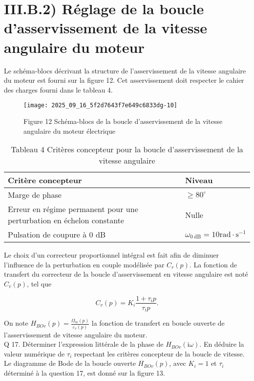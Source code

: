 \section{III.B.2) Réglage de la boucle d'asservissement de la vitesse angulaire du moteur}
Le schéma-blocs décrivant la structure de l'asservissement de la vitesse angulaire du moteur est fourni sur la figure 12. Cet asservissement doit respecter le cahier des charges fourni dans le tableau 4.

\begin{figure}[h]
\begin{center}
  \texttt{[image: 2025\_09\_16\_5f2d7643f7e649c6833dg-10]}
\captionsetup{labelformat=empty}
\caption{Figure 12 Schéma-blocs de la boucle d'asservissement de la vitesse angulaire du moteur électrique}
\end{center}
\end{figure}

\begin{table}[h]
\begin{center}
\begin{tabular}{|l|l|}
\hline
Critère concepteur & Niveau \\
\hline
Marge de phase & $\geqslant 80^{\circ}$ \\
\hline
Erreur en régime permanent pour une perturbation en échelon constante & Nulle \\
\hline
Pulsation de coupure à 0 dB & $\omega_{0 \mathrm{~dB}}=10 \mathrm{rad} \cdot \mathrm{s}^{-1}$ \\
\hline
\end{tabular}
\captionsetup{labelformat=empty}
\caption{Tableau 4 Critères concepteur pour la boucle d'asservissement de la vitesse angulaire}
\end{center}
\end{table}

Le choix d'un correcteur proportionnel intégral est fait afin de diminuer l'influence de la perturbation en couple modélisée par $C_{r}(p)$. La fonction de transfert du correcteur de la boucle d'asservissement en vitesse angulaire est noté $C_{v}(p)$, tel que

$$
C_{v}(p)=K_{i} \frac{1+\tau_{i} p}{\tau_{i} p} .
$$

On note $H_{B O v}(p)=\frac{\Omega_{m}(p)}{\varepsilon_{v}(p)}$ la fonction de transfert en boucle ouverte de l'asservissement de vitesse angulaire du moteur.\\
Q 17. Déterminer l'expression littérale de la phase de $H_{B O v}(\mathrm{i} \omega)$. En déduire la valeur numérique de $\tau_{i}$ respectant les critères concepteur de la boucle de vitesse.\\
Le diagramme de Bode de la boucle ouverte $H_{B O v}(p)$, avec $K_{i}=1$ et $\tau_{i}$ déterminé à la question 17, est donné sur la figure 13.

